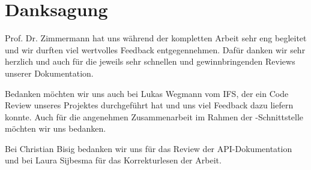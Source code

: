 \section*{Danksagung}

	Prof. Dr. Zimmermann hat uns während der kompletten Arbeit sehr eng begleitet und wir durften viel wertvolles Feedback entgegennehmen.
	Dafür danken wir sehr herzlich und auch für die jeweils sehr schnellen und gewinnbringenden Reviews unserer Dokumentation.
	
	Bedanken möchten wir uns auch bei Lukas Wegmann vom IFS,
	der ein Code Review unseres Projektes durchgeführt hat und uns viel Feedback dazu liefern konnte.
	Auch für die angenehmen Zusammenarbeit im Rahmen der \dks -Schnittstelle möchten wir uns bedanken.
	
	Bei Christian Bisig bedanken wir uns für das Review der API-Dokumentation
	und bei Laura Sijbesma für das Korrekturlesen der Arbeit.
